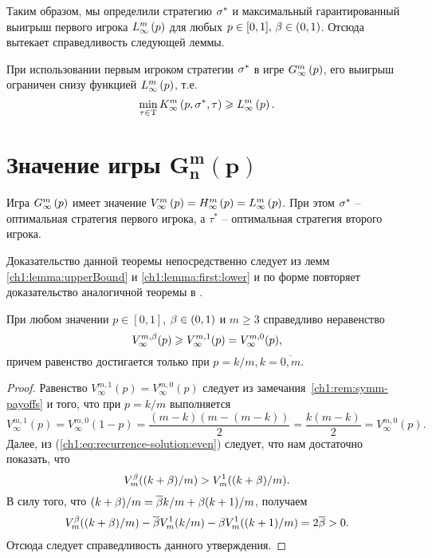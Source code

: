 {Таким образом, мы определили стратегию $\sigma^*$ и максимальный гарантированный выигрыш первого игрока $L_{\infty}^m\left({p}\right)$ для любых $p \in [0, 1], \, \beta \in (0, 1)$.
Отсюда вытекает справедливость следующей леммы.

\begin{lemma}
  \label{ch1:lemma:first:lower}
  При использовании первым игроком стратегии $\sigma^*$ в игре $G_{\infty}^m\left({p}\right)$\textup{,} его выигрыш ограничен снизу функцией $L_{\infty}^m\left({p}\right)$\textup{,} т.е.
  \[
    \min_{\tau \in \mathrm{T}} K_{\infty}^m\left({p}, {\sigma^*}, {\tau}\right) \geqslant
    L_{\infty}^m\left({p}\right).
  \]
\end{lemma}

\section{Значение игры $\mathbf{G^m_n(p)}$}\label{ch1:game-value}

\begin{theorem}
  Игра $G_{\infty}^m\left({p}\right)$ имеет значение $V_{\infty}^m\left({p}\right) = H_{\infty}^m\left({p}\right) = L_{\infty}^m\left({p}\right)$.
  При этом $\sigma^*$ -- оптимальная стратегия первого игрока\textup{,} а $\tau^*$ -- оптимальная стратегия второго игрока.
\end{theorem}
Доказательство данной теоремы непосредственно следует из лемм \ref{ch1:lemma:upperBound} и \ref{ch1:lemma:first:lower} и по форме повторяет доказательство аналогичной теоремы в \cite{domansky07}.

\begin{proposition}
  \label{ch1:prop:value-comparison}
  При любом значении $p \in [0,1]$, $\beta \in (0,1)$ и $m \geq 3$ справедливо неравенство
  \begin{equation*}
    V^{m, \beta}_\infty(p) \geqslant V^{m,1}_\infty(p) = V^{m,0}_\infty(p),
  \end{equation*}
  причем равенство достигается только при $p = k/m, k = \overline{0,m}$.
\end{proposition}
\begin{proof}
  Равенство $V^{m, 1}_\infty(p) = V^{m,0}_\infty(p)$ следует из замечания~\ref{ch1:rem:symm-payoffs} и того, что при $p = k/m$ выполняется
  \begin{equation*}
    V^{m, 1}_\infty(p) = V^{m, 0}_\infty(1-p) = \frac{(m-k)(m-(m-k))}{2} = \frac{k(m-k)}{2} = V^{m, 0}_\infty(p).
  \end{equation*}
  Далее, из (\ref{ch1:eq:recurrence-solution:even}) следует, что нам достаточно показать, что 
  \[
    V^\beta_m((k+\beta)/m) > V^1_m((k+\beta)/m).
  \]
  В силу того, что $(k+\beta)/m = {\overline{\beta}} k/m + \beta (k+1)/m$, получаем
  \begin{gather*}
    V^{\beta}_m((k+\beta)/m) - {\overline{\beta}} V^1_m(k/m) - \beta V^1_m((k+1)/m) = 2{\overline{\beta}} > 0.
  \end{gather*}
  Отсюда следует справедливость данного утверждения.
\end{proof}

}
